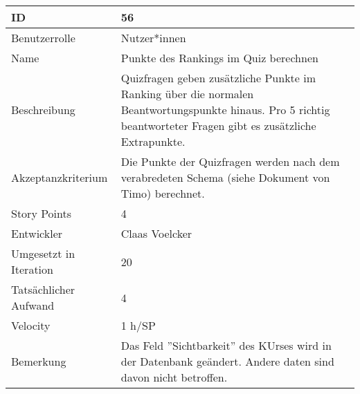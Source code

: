 \begin{tabularx}{\textwidth}{|p{}|X|}
	\hline
	ID & 56\\
	\hline
	Benutzerrolle & Nutzer*innen\\
	\hline
	Name & Punkte des Rankings im Quiz berechnen\\
	\hline
	Beschreibung & Quizfragen geben zusätzliche Punkte im Ranking über die normalen Beantwortungspunkte hinaus. Pro 5 richtig beantworteter Fragen gibt es zusätzliche Extrapunkte.\\
	\hline
	Akzeptanzkriterium & Die Punkte der Quizfragen werden nach dem verabredeten Schema (siehe Dokument von Timo) berechnet.\\
	\hline
	Story Points & 4\\
	\hline
	Entwickler & Claas Voelcker\\
	\hline
	Umgesetzt in Iteration & 20\\
	\hline
	Tatsächlicher Aufwand & 4\\
	\hline
	Velocity & 1 h/SP\\
	\hline
	Bemerkung & Das Feld ''Sichtbarkeit'' des KUrses wird in der Datenbank geändert. Andere daten sind davon nicht betroffen.\\
	\hline
\end{tabularx}
\vspace{20pt}
